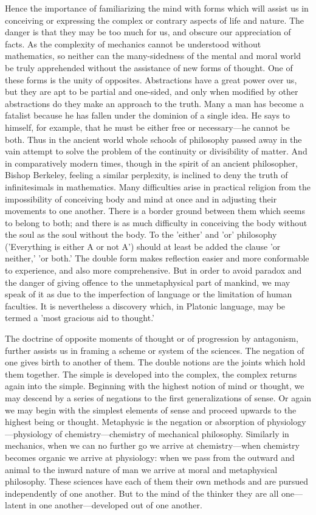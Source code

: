 \documentclass[11pt,letter]{article}
\begin{document}
\par  Hence the importance of familiarizing the mind with forms which will assist us in conceiving or expressing the complex or contrary aspects of life and nature. The danger is that they may be too much for us, and obscure our appreciation of facts. As the complexity of mechanics cannot be understood without mathematics, so neither can the many-sidedness of the mental and moral world be truly apprehended without the assistance of new forms of thought. One of these forms is the unity of opposites. Abstractions have a great power over us, but they are apt to be partial and one-sided, and only when modified by other abstractions do they make an approach to the truth. Many a man has become a fatalist because he has fallen under the dominion of a single idea. He says to himself, for example, that he must be either free or necessary—he cannot be both. Thus in the ancient world whole schools of philosophy passed away in the vain attempt to solve the problem of the continuity or divisibility of matter. And in comparatively modern times, though in the spirit of an ancient philosopher, Bishop Berkeley, feeling a similar perplexity, is inclined to deny the truth of infinitesimals in mathematics. Many difficulties arise in practical religion from the impossibility of conceiving body and mind at once and in adjusting their movements to one another. There is a border ground between them which seems to belong to both; and there is as much difficulty in conceiving the body without the soul as the soul without the body. To the 'either' and 'or' philosophy ('Everything is either A or not A') should at least be added the clause 'or neither,' 'or both.' The double form makes reflection easier and more conformable to experience, and also more comprehensive. But in order to avoid paradox and the danger of giving offence to the unmetaphysical part of mankind, we may speak of it as due to the imperfection of language or the limitation of human faculties. It is nevertheless a discovery which, in Platonic language, may be termed a 'most gracious aid to thought.'

\par  The doctrine of opposite moments of thought or of progression by antagonism, further assists us in framing a scheme or system of the sciences. The negation of one gives birth to another of them. The double notions are the joints which hold them together. The simple is developed into the complex, the complex returns again into the simple. Beginning with the highest notion of mind or thought, we may descend by a series of negations to the first generalizations of sense. Or again we may begin with the simplest elements of sense and proceed upwards to the highest being or thought. Metaphysic is the negation or absorption of physiology—physiology of chemistry—chemistry of mechanical philosophy. Similarly in mechanics, when we can no further go we arrive at chemistry—when chemistry becomes organic we arrive at physiology: when we pass from the outward and animal to the inward nature of man we arrive at moral and metaphysical philosophy. These sciences have each of them their own methods and are pursued independently of one another. But to the mind of the thinker they are all one—latent in one another—developed out of one another.
\end{document}
